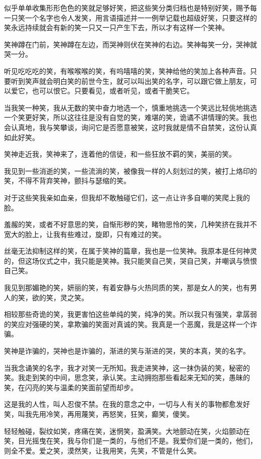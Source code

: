 \documentclass[UTF8]{article}
\begin{document}
\par 似乎单单收集形形色色的笑就足够好笑，把这些笑分类归档也是特别好笑，赐予每一只笑一个名字也令人发笑，用言语描述并一一例举记载也超级好笑，只要这样的笑永远持续就会有新的笑一只又一只产生下去，所以才有这样一个笑神。
\par 笑神蹲在门前，笑神蹲在左边，而哭神则伏在笑神的右边。笑神每笑一分，哭神就哭一分。
\par 听见吃吃吃的笑，有喉喉喉的笑，有呜嘻嘻的笑，笑神给他的笑加上各种声音。只要听到笑声就会明白笑的前世今生，就可以叫出笑的名字，可以跟它做上朋友，可以爱它，也可以恨它。只要看见，或者听见，或者干脆笑它。
\par 当我笑一种笑，我从无数的笑中奋力地选一个，慎重地挑选一个笑远比轻佻地挑选一个笑更好笑，所以这往往是没有自觉的笑，难堪的笑，诡谲不讲情理的笑。我也会认真地，我与笑攀谈，询问它是否愿意被笑，这时我就是情不自禁笑，这份认真如此好笑。
\par 笑神走近我，笑神来了，连着他的信徒，和一些狂放不羁的笑，美丽的笑。
\\[0.6cm]
\par 我见到一些消逝的笑，一些流淌的笑，被像我一样的人刻划过的笑，被打上烙印的笑，不得不背弃笑神，颤抖与瑟缩的笑。
\par 对于这些笑我亲如血亲，但我却不敢触碰它们，这一点让许多自嘲的笑爬上我的脸。
\par 羞赧的笑，或者不好意思的笑，自惭形秽的笑，睹物思怜的笑，几种笑挤在我并不宽大的脸上，让我有些难过，旋即，只有难过的笑。
\par 丝毫无法抑制这样的笑，在属于笑神的篇章，我也是一位笑神。我原本是任何神灵的，但这场仪式之中，我只能是笑神。我只能笑自己笑，哭自己笑，并嘲讽与愤恨自己笑。
\par 我见到那媚艳的笑，妍丽的笑，有着安静与火热同质的笑，那是女人的笑，也有男人的笑，欲的笑，灵之笑。
\par 相较那些奇诡的笑，我更害怕这些单纯的笑，纯净的笑。所以我只有强笑，拿孱弱的笑应对强硬的笑，拿欺骗的笑面对真诚的笑。我真是一个恶魔，我是这样一个诈骗。
\par 笑神是诈骗的，哭神也是诈骗的，渐进的笑与渐进的哭，笑的本真，笑的名字。
\par 当我念诵笑的名字，我才对笑一无所知。我走进笑神，这一抹伪装的笑，秘密的笑。我走到笑的中间，思念笑，承认笑。主动拥抱那些看起来无知的笑，愚昧的笑，在闪亮的笑与温柔的笑面前望而却步。
\par 这是我的人性，叫人忍俊不禁。在我的意念之中，一切与人有关的事物都愈发好笑，叫我先用冷笑，再用蔑笑，再怒笑，狂笑，癫笑，傻笑。
\par 轻轻触碰，裂纹如笑，疼痛在笑，迷惘笑，盈满笑。大地颤动在笑，火焰颤动在笑，目光摇曳在笑，我与你们是一类的，与他们不是。我爱你们是一类的，他们，则全不爱。爱之笑，漠然笑，让我用笑，先笑，不管是什么笑。
\end{document}
